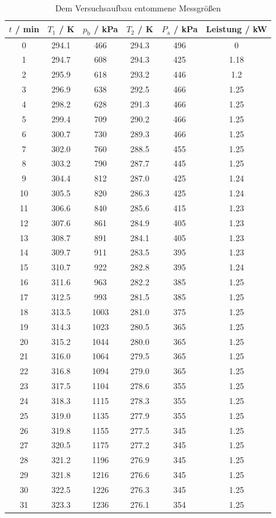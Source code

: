 \begin{table}
  \centering
  \begin{tabular}{c c c c c c}
    \toprule
    $t$ / min & $T_\text{1}$ / K & $p_\text{b}$ / kPa & $T_\text{2}$ / K & $P_\text{a}$ / kPa & Leistung / kW \\
    \midrule
    0 	& 294.1 & 466	& 294.3	& 496	& 0	    \\
    1 	& 294.7 & 608	& 294.3	& 425	& 1.18	\\
    2 	& 295.9 & 618	& 293.2	& 446	& 1.2	  \\
    3 	& 296.9 & 638	& 292.5	& 466	& 1.25	\\
    4	  & 298.2	& 628	& 291.3	& 466	& 1.25	\\
    5	  & 299.4 & 709	& 290.2	& 466	& 1.25	\\
    6	  & 300.7 & 730	& 289.3	& 466	& 1.25	\\
    7	  & 302.0 & 760	& 288.5	& 455	& 1.25	\\
    8	  & 303.2	& 790	& 287.7	& 445	& 1.25	\\
    9	  & 304.4 & 812	& 287.0	& 425	& 1.24	\\
    10	& 305.5 & 820	& 286.3	& 425	& 1.24	\\
    11 	& 306.6 & 840	& 285.6	& 415	& 1.23	\\
    12	& 307.6	& 861	& 284.9	& 405	& 1.23	\\
    13	& 308.7 & 891	& 284.1	& 405	& 1.23	\\
    14 	& 309.7 & 911	& 283.5	& 395	& 1.23	\\
    15 	& 310.7 & 922	& 282.8	& 395	& 1.24	\\
    16 	& 311.6	& 963	& 282.2	& 385	& 1.25	\\
    17	& 312.5	& 993	& 281.5	& 385	& 1.25	\\
    18	& 313.5	& 1003	& 281.0	& 375	& 1.25	\\
    19	& 314.3	& 1023	& 280.5	& 365	& 1.25	\\
    20	& 315.2	& 1044	& 280.0	& 365	& 1.25	\\
    21	& 316.0	& 1064	& 279.5	& 365	& 1.25	\\
    22	& 316.8	& 1094	& 279.0	& 365	& 1.25	\\
    23	& 317.5	& 1104	& 278.6	& 355	& 1.25	\\
    24	& 318.3	& 1115	& 278.3	& 355	& 1.25	\\
    25	& 319.0	& 1135	& 277.9	& 355	& 1.25	\\
    26	& 319.8	& 1155	& 277.5	& 345	& 1.25	\\
    27	& 320.5	& 1175	& 277.2	& 345	& 1.25	\\
    28	& 321.2	& 1196	& 276.9	& 345	& 1.25	\\
    29	& 321.8	& 1216	& 276.6	& 345	& 1.25	\\
    30	& 322.5	& 1226	& 276.3	& 345	& 1.25	\\
    31	& 323.3	& 1236	& 276.1	& 354	& 1.25	\\
  \end{tabular}
  \caption{Dem Versuchsaufbau entommene Messgrößen}
  \label{tab:Daten}
\end{table}

